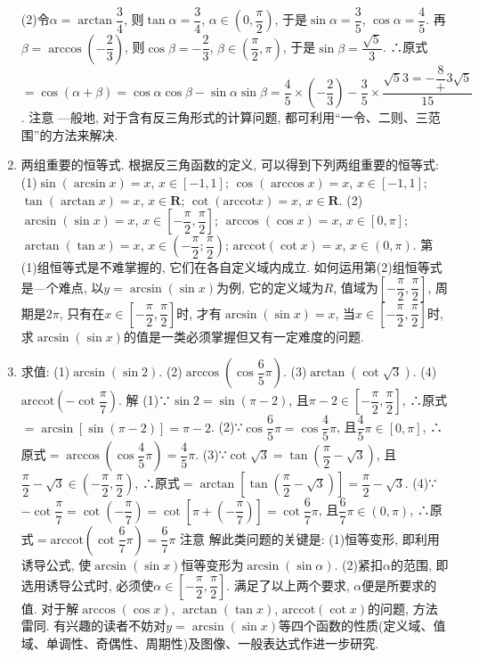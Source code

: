 \documentclass[10pt,a4paper]{article}
\begin{document}
\begin{enumerate}[1.]
(2)令$\alpha =\arctan \dfrac 34$, 则$\tan \alpha =\dfrac 34$, $\alpha \in (0,\dfrac{\pi }2)$, 于是$\sin \alpha =\dfrac 35$, $\cos \alpha =\dfrac 45$.
再$\beta =\arccos (-\dfrac 23)$, 则$\cos \beta =-\dfrac 23$, $\beta \in (\dfrac{\pi }2,\pi)$, 于是$\sin \beta =\dfrac{\sqrt 5}3$.
∴原式$=\cos (\alpha +\beta)=\cos \alpha \cos \beta -\sin \alpha \sin \beta =\dfrac 45\times (-\dfrac 23)-\dfrac 35\times \dfrac{\sqrt 53=-\dfrac 8+3\sqrt 5}{15}$.
注意  —般地, 对于含有反三角形式的计算问题, 都可利用``一令、二则、三范围''的方法来解决.
\item 两组重要的恒等式.
根据反三角函数的定义, 可以得到下列两组重要的恒等式:
(1)$\sin (\arcsin x)=x$, $x\in [-1,1]$; $\cos (\arccos x)=x$, $x\in [-1,1]$; $\tan (\arctan x)=x$, $x\in \mathbf{R}$; $\cot (\mathrm{arccot} x)=x$, $x\in \mathbf{R}$.
(2)$\arcsin (\sin x)=x$, $x\in [-\dfrac{\pi }2,\dfrac{\pi }2]$; $\arccos (\cos x)=x$, $x\in [0,\pi]$; $\arctan (\tan x)=x$, $x\in (-\dfrac{\pi }2;\dfrac{\pi }2)$; $\mathrm{arccot} (\cot x)=x$, $x\in (0,\pi)$.
第(1)组恒等式是不难掌握的, 它们在各自定义域内成立.
如何运用第(2)组恒等式是—个难点, 以$y=\arcsin (\sin x)$为例, 它的定义域为$R$, 值域为$[-\dfrac{\pi }2,\dfrac{\pi }2]$, 周期是$2\pi$, 只有在$x\in [-\dfrac{\pi }2,\dfrac{\pi }2]$时, 才有$\arcsin (\sin x)=x$, 当$x\in [-\dfrac{\pi }2,\dfrac{\pi }2]$时, 求$\arcsin (\sin x)$的值是一类必须掌握但又有一定难度的问题.
\item 求值:
(1)$\arcsin (\sin 2)$.						(2)$\arccos (\cos \dfrac 65\pi)$.
(3)$\arctan (\cot \sqrt 3)$.						(4)$\mathrm{arccot} (-\cot \dfrac{\pi }7)$.
解  (1)∵$\sin 2=\sin (\pi -2)$, 且$\pi -2\in [-\dfrac{\pi }2,\dfrac{\pi }2]$,
∴原式$=\arcsin [\sin (\pi -2)]=\pi -2$.
(2)∵$\cos \dfrac 65\pi =\cos \dfrac 45\pi$, 且$\dfrac 45\pi \in [0,\pi]$, ∴原式$=\arccos (\cos \dfrac 45\pi)=\dfrac 45\pi$.
(3)∵$\cot \sqrt 3=\tan (\dfrac{\pi }2-\sqrt 3)$, 且$\dfrac{\pi }2-\sqrt 3\in (-\dfrac{\pi }2,\dfrac{\pi }2)$,
∴原式$=\arctan [\tan (\dfrac{\pi }2-\sqrt 3)]=\dfrac{\pi }2-\sqrt 3$.
(4)∵$-\cot \dfrac{\pi }7=\cot (-\dfrac{\pi }7)=\cot [\pi +(-\dfrac{\pi }7)]=\cot \dfrac 67\pi$, 且$\dfrac 67\pi \in (0,\pi)$,
∴原式$=\mathrm{arccot} (\cot \dfrac 67\pi)=\dfrac 67\pi$
注意  解此类问题的关键是:
(1)恒等变形, 即利用诱导公式, 使$\arcsin (\sin x)$恒等变形为$\arcsin (\sin \alpha)$.
(2)紧扣$\alpha$的范围, 即选用诱导公式时, 必须使$\alpha \in [-\dfrac{\pi }2,\dfrac{\pi }2]$.
满足了以上两个要求, $\alpha$便是所要求的值.
对于解$\arccos (\cos x)$, $\arctan (\tan x)$, $\mathrm{arccot} (\cot x)$的问题, 方法雷同.
有兴趣的读者不妨对$y=\arcsin (\sin x)$等四个函数的性质(定义域、值域、单调性、奇偶性、周期性)及图像、一般表达式作进一步研究.

\end{enumerate}
\end{document}
